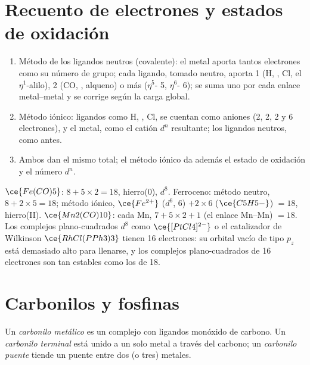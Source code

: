 \section{Recuento de electrones y estados de oxidación}

\begin{method}\label{met:b3:organometallic-bonding:count}
\begin{enumerate}
  \item Método de los ligandos neutros (covalente): el metal aporta tantos electrones como su número
        de grupo; cada ligando, tomado neutro, aporta 1 (H, , Cl, el
        $\eta^1$-alilo), 2 (CO, , alqueno) o más ($\eta^5$- 5, $\eta^6$- 6); se suma uno por cada
        enlace metal--metal y se corrige según la carga global.
  \item Método iónico: ligandos como H, , Cl,  se cuentan como aniones (2, 2,
        2 y 6 electrones), y el metal, como el catión $d^n$ resultante; los ligandos neutros,
        como antes.
  \item Ambos dan el mismo total; el método iónico da además el estado de oxidación
        y el número $d^n$.
\end{enumerate}
\end{method}

\begin{example}[Recuento]\label{ex:b3:organometallic-bonding:count}
$\ce{Fe(CO)5}$: $8 + 5 \times 2 = 18$, hierro(0), $d^8$. Ferroceno: método neutro, $8 + 2 \times 5 = 18$; método iónico,
$\ce{Fe^{2+}}$ ($d^6$, 6) $+ 2 \times 6$ ($\ce{C5H5-}$) $= 18$, hierro(II). $\ce{Mn2(CO)10}$: cada Mn, $7 + 5 \times 2 + 1$ (el enlace
Mn--Mn) $= 18$. Los complejos plano-cuadrados $d^8$ como $\ce{[PtCl4]^{2-}}$ o el catalizador de Wilkinson
$\ce{RhCl(PPh3)3}$ tienen 16 electrones: su orbital vacío de tipo $p_z$ está demasiado alto para llenarse, y
los complejos plano-cuadrados de 16 electrones son tan estables como los de 18.
\end{example}

\section{Carbonilos y fosfinas}

\begin{definition}\label{def:b3:organometallic-bonding:carbonyl}
Un \emph{carbonilo metálico} es un complejo con ligandos
monóxido de carbono. Un \emph{carbonilo terminal} está unido a un solo
metal a través del carbono; un \emph{carbonilo puente} tiende un puente entre
dos (o tres) metales.
\end{definition}

